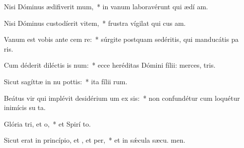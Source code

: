\item Nisi Dóminus ædifiverit mum,~* in vanum laboravérunt qui ædí am.
\item Nisi Dóminus custodíerit vitem,~* frustra vígilat qui cus am.
\item Vanum est vobis ante cem re:~* súrgite postquam sedéritis, qui manducátis pa ris.
\item Cum déderit diléctis is num:~* ecce heréditas Dómini fílii: merces,  tris.
\item Sicut sagíttæ in nu pottis:~* ita fílii rum.
\item Beátus vir qui implévit desidérium um ex sis:~* non confundétur cum loquétur inimícis su  ta.
\item Glória tri, et o,~* et Spirí to.
\item Sicut erat in princípio, et , et per,~* et in sǽcula sæcu. men.
